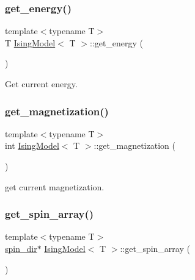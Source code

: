 \subsubsection{\texorpdfstring{get\+\_\+energy()}{get\_energy()}}
{\footnotesize\ttfamily template$<$typename T$>$ \\
T \mbox{\hyperlink{classIsingModel}{Ising\+Model}}$<$ T $>$\+::get\+\_\+energy (\begin{DoxyParamCaption}{ }\end{DoxyParamCaption})\hspace{0.3cm}{\ttfamily [inline]}}



Get current energy. 

\mbox{\label{classIsingModel_a58c9ebc61c0b2238fd52b62df8ce4853}} 
\subsubsection{\texorpdfstring{get\+\_\+magnetization()}{get\_magnetization()}}
{\footnotesize\ttfamily template$<$typename T$>$ \\
int \mbox{\hyperlink{classIsingModel}{Ising\+Model}}$<$ T $>$\+::get\+\_\+magnetization (\begin{DoxyParamCaption}{ }\end{DoxyParamCaption})\hspace{0.3cm}{\ttfamily [inline]}}



get current magnetization. 

\mbox{\label{classIsingModel_ad82f225e1b45f11ee5a99c3b12b25302}} 
\subsubsection{\texorpdfstring{get\+\_\+spin\+\_\+array()}{get\_spin\_array()}}
{\footnotesize\ttfamily template$<$typename T$>$ \\
\mbox{\hyperlink{classspin__dir}{spin\+\_\+dir}}$\ast$ \mbox{\hyperlink{classIsingModel}{Ising\+Model}}$<$ T $>$\+::get\+\_\+spin\+\_\+array (\begin{DoxyParamCaption}{ }\end{DoxyParamCaption})\hspace{0.3cm}{\ttfamily [inline]}}

